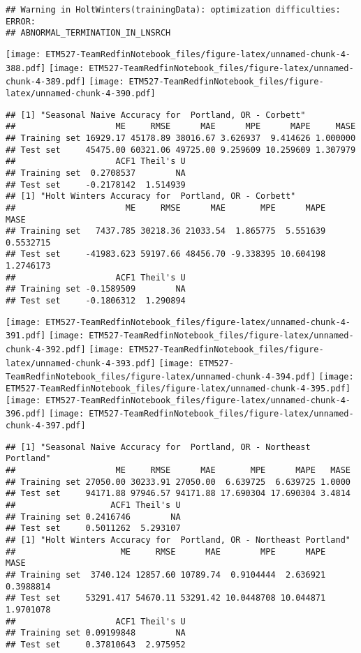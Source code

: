 \documentclass[]{article}
\begin{document}
\begin{verbatim}
## Warning in HoltWinters(trainingData): optimization difficulties: ERROR:
## ABNORMAL_TERMINATION_IN_LNSRCH
\end{verbatim}

\texttt{[image: ETM527-TeamRedfinNotebook\_files/figure-latex/unnamed-chunk-4-388.pdf]}
\texttt{[image: ETM527-TeamRedfinNotebook\_files/figure-latex/unnamed-chunk-4-389.pdf]}
\texttt{[image: ETM527-TeamRedfinNotebook\_files/figure-latex/unnamed-chunk-4-390.pdf]}

\begin{verbatim}
## [1] "Seasonal Naive Accuracy for  Portland, OR - Corbett"
##                    ME     RMSE      MAE      MPE      MAPE     MASE
## Training set 16929.17 45178.89 38016.67 3.626937  9.414626 1.000000
## Test set     45475.00 60321.06 49725.00 9.259609 10.259609 1.307979
##                    ACF1 Theil's U
## Training set  0.2708537        NA
## Test set     -0.2178142  1.514939
## [1] "Holt Winters Accuracy for  Portland, OR - Corbett"
##                      ME     RMSE      MAE       MPE      MAPE      MASE
## Training set   7437.785 30218.36 21033.54  1.865775  5.551639 0.5532715
## Test set     -41983.623 59197.66 48456.70 -9.338395 10.604198 1.2746173
##                    ACF1 Theil's U
## Training set -0.1589509        NA
## Test set     -0.1806312  1.290894
\end{verbatim}

\texttt{[image: ETM527-TeamRedfinNotebook\_files/figure-latex/unnamed-chunk-4-391.pdf]}
\texttt{[image: ETM527-TeamRedfinNotebook\_files/figure-latex/unnamed-chunk-4-392.pdf]}
\texttt{[image: ETM527-TeamRedfinNotebook\_files/figure-latex/unnamed-chunk-4-393.pdf]}
\texttt{[image: ETM527-TeamRedfinNotebook\_files/figure-latex/unnamed-chunk-4-394.pdf]}
\texttt{[image: ETM527-TeamRedfinNotebook\_files/figure-latex/unnamed-chunk-4-395.pdf]}
\texttt{[image: ETM527-TeamRedfinNotebook\_files/figure-latex/unnamed-chunk-4-396.pdf]}
\texttt{[image: ETM527-TeamRedfinNotebook\_files/figure-latex/unnamed-chunk-4-397.pdf]}

\begin{verbatim}
## [1] "Seasonal Naive Accuracy for  Portland, OR - Northeast Portland"
##                    ME     RMSE      MAE       MPE      MAPE   MASE
## Training set 27050.00 30233.91 27050.00  6.639725  6.639725 1.0000
## Test set     94171.88 97946.57 94171.88 17.690304 17.690304 3.4814
##                   ACF1 Theil's U
## Training set 0.2416746        NA
## Test set     0.5011262  5.293107
## [1] "Holt Winters Accuracy for  Portland, OR - Northeast Portland"
##                     ME     RMSE      MAE        MPE      MAPE      MASE
## Training set  3740.124 12857.60 10789.74  0.9104444  2.636921 0.3988814
## Test set     53291.417 54670.11 53291.42 10.0448708 10.044871 1.9701078
##                    ACF1 Theil's U
## Training set 0.09199848        NA
## Test set     0.37810643  2.975952
\end{verbatim}
\end{document}
